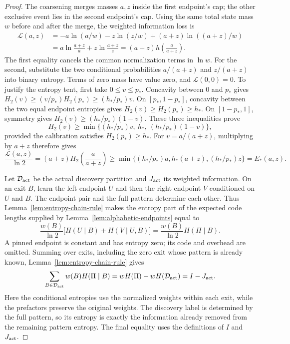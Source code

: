 \begin{proof}
The coarsening merges masses $a,z$ inside the first endpoint's cap;
the other exclusive event lies in the second endpoint's cap.
Using the same total state mass $w$ before and after the merge,
the weighted information loss is
\[
 \begin{aligned}
 \mathcal L(a,z)
 &=-a\ln(a/w)-z\ln(z/w)+(a+z)\ln((a+z)/w)\\
 &=a\ln\frac{a+z}{a}+z\ln\frac{a+z}{z}
   =(a+z)h\!\left(\frac a{a+z}\right).
 \end{aligned}
\]
The first equality cancels the common normalization terms
in $\ln w$. For the second, substitute the two conditional
probabilities $a/(a+z)$ and $z/(a+z)$ into binary entropy.
Terms of zero mass have value zero, and $\mathcal L(0,0)=0$.
To justify the entropy tent, first take $0\le v\le p_*$. Concavity
between $0$ and $p_*$ gives
$H_2(v)\ge(v/p_*)H_2(p_*)\ge(h_*/p_*)v$.
On $[p_*,1-p_*]$, concavity between the two equal endpoint
entropies gives $H_2(v)\ge H_2(p_*)\ge h_*$.
On $[1-p_*,1]$, symmetry gives
$H_2(v)\ge(h_*/p_*)(1-v)$. These three inequalities prove
\[
 H_2(v)\ge\min\{(h_*/p_*)v,\ h_*,\ (h_*/p_*)(1-v)\},
\]
provided the calibration satisfies $H_2(p_*)\ge h_*$.
For $v=a/(a+z)$, multiplying by $a+z$ therefore gives
\[
 \frac{\mathcal L(a,z)}{\ln2}
 =(a+z)H_2\!\left(\frac a{a+z}\right)
 \ge\min\{(h_*/p_*)a,h_*(a+z),(h_*/p_*)z\}
 =E_*(a,z).
\]

Let $\mathcal D_{\rm act}$ be the actual discovery partition and
$J_{\rm act}$ its weighted information. On an exit $B$, learn the
left endpoint $U$ and then the right endpoint $V$ conditioned on
$U$ and $B$. The endpoint pair and the full pattern determine
each other. Thus Lemma~\ref{lem:entropy-chain-rule} makes the
entropy part of the expected code lengths supplied by
Lemma~\ref{lem:alphabetic-endpoints} equal to
\[
 \frac{w(B)}{\ln2}\bigl[H(U\mid B)+H(V\mid U,B)\bigr]
 =\frac{w(B)}{\ln2}H(\Pi\mid B).
\]
A pinned endpoint is constant and has entropy zero; its code and
overhead are omitted. Summing over exits, including the zero exit
whose pattern is already known, Lemma~\ref{lem:entropy-chain-rule} gives
\[
 \sum_{B\in\mathcal D_{\rm act}}w(B)H(\Pi\mid B)
 =wH(\Pi)-wH(\mathcal D_{\rm act})=I-J_{\rm act}.
\]
Here the conditional entropies use the normalized weights within
each exit, while the prefactors preserve the original weights.
The discovery label is determined by the full pattern, so its
entropy is exactly the information already removed from the
remaining pattern entropy. The final equality uses the definitions
of $I$ and $J_{\rm act}$.


\end{proof}
